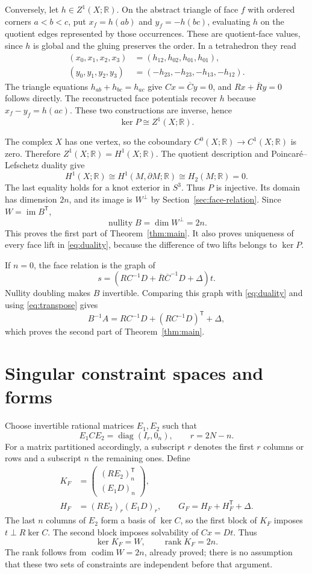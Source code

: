 \documentclass[11pt]{article}
\theoremstyle{definition}\newtheorem{definition}[theorem]{Definition}
\theoremstyle{remark}\newtheorem{remark}[theorem]{Remark}
\DeclareMathOperator{\im}{im}
\DeclareMathOperator{\rank}{rank}
\DeclareMathOperator{\nullity}{nullity}
\DeclareMathOperator{\diag}{diag}
\newcommand{\R}{\mathbb R}
\newcommand{\Ct}{\overline C}
\newcommand{\Rt}{\overline R}
\begin{document}
Conversely, let $h\in Z^1(X;\R)$. On the abstract triangle of face $f$
with ordered corners $a<b<c$, put $x_f=h(ab)$ and $y_f=-h(bc)$,
evaluating $h$ on the quotient edges represented by those occurrences.
These are quotient-face
values, since $h$ is global and the gluing preserves the order. In a
tetrahedron they read
\begin{align*}
(x_0,x_1,x_2,x_3)&=(h_{12},h_{02},h_{01},h_{01}),\\
(y_0,y_1,y_2,y_3)&=(-h_{23},-h_{23},-h_{13},-h_{12}).
\end{align*}
The triangle equations $h_{ab}+h_{bc}=h_{ac}$ give
$Cx=\Ct y=0$, and $Rx+\Rt y=0$ follows directly. The reconstructed
face potentials recover $h$ because $x_f-y_f=h(ac)$. These two
constructions are inverse, hence
\[
\ker P\cong Z^1(X;\R).
\]

The complex $X$ has one vertex, so the coboundary
$C^0(X;\R)\to C^1(X;\R)$ is zero. Therefore $Z^1(X;\R)=H^1(X;\R)$.
The quotient description and Poincar\'e--Lefschetz duality give
\[
H^1(X;\R)\cong H^1(M,\partial M;\R)
\cong H_2(M;\R)=0.
\]
The last equality holds for a knot exterior in $S^3$. Thus $P$ is
injective. Its domain has dimension $2n$, and its image is $W^\perp$
by Section~\ref{sec:face-relation}. Since $W=\im B^{\mathsf T}$,
\[
\nullity B=\dim W^\perp=2n.
\]
This proves the first part of Theorem~\ref{thm:main}. It also proves
uniqueness of every face lift in \eqref{eq:duality}, because the
difference of two lifts belongs to $\ker P$.

If $n=0$, the face relation is the graph of
\[
s=(RC^{-1}D+\Rt\Ct^{-1}D+\Delta)t.
\]
Nullity doubling makes $B$ invertible. Comparing this graph with
\eqref{eq:duality} and using \eqref{eq:transpose} gives
\[
B^{-1}A=RC^{-1}D+(RC^{-1}D)^{\mathsf T}+\Delta,
\]
which proves the second part of Theorem~\ref{thm:main}.

\section{Singular constraint spaces and forms}\label{sec:singular}
Choose invertible rational matrices $E_1,E_2$ such that
\[
E_1CE_2=\diag(I_r,0_n),\qquad r=2N-n.
\]
For a matrix partitioned accordingly, a subscript $r$ denotes the
first $r$ columns or rows and a subscript $n$ the remaining ones.
Define
\begin{align*}
K_F&=\begin{pmatrix}(RE_2)_n^{\mathsf T}\\(E_1D)_n\end{pmatrix},\\
H_F&=(RE_2)_r(E_1D)_r,\qquad
G_F=H_F+H_F^{\mathsf T}+\Delta.
\end{align*}
The last $n$ columns of $E_2$ form a basis of $\ker C$, so the first
block of $K_F$ imposes $t\perp R\ker C$. The second block imposes
solvability of $Cx=Dt$. Thus
\[
\ker K_F=W,\qquad\rank K_F=2n.
\]
The rank follows from $\operatorname{codim}W=2n$, already proved;
there is no assumption that these two sets of constraints are
independent before that argument.
\end{document}
